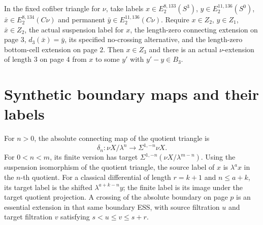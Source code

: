 \begin{theorem}
\label{sem:ProofTools:nu-zero-layer}
In the fixed cofiber triangle for $\nu$, take labels $x\in E_2^{8,133}(S^3)$, $y\in E_2^{11,136}(S^0)$, $\bar x\in E_2^{8,134}(C\nu)$ and permanent $\bar y\in E_2^{11,136}(C\nu)$. Require $x\in Z_2$, $y\in Z_1$, $\bar x\in Z_2$, the actual suspension label for $x$, the length-zero connecting extension on page $3$, $d_3(\bar x)=\bar y$, its specified no-crossing alternative, and the length-zero bottom-cell extension on page $2$. Then $x\in Z_3$ and there is an actual $\nu$-extension of length $3$ on page $4$ from $x$ to some $y'$ with $y'-y\in B_3$.
\end{theorem}

\section{Synthetic boundary maps and their labels}
\begin{definition}
\label{sem:ProofTools:synthetic-boundary-labels}
For $n>0$, the absolute connecting map of the quotient triangle is
\[\delta_n:\nu X/\lambda^n\longrightarrow\Sigma^{1,-n}\nu X.\]
For $0<n<m$, its finite version has target $\Sigma^{1,-n}(\nu X/\lambda^{m-n})$. Using the suspension isomorphism of the quotient triangle, the source label of $x$ is $\lambda^a x$ in the $n$-th quotient. For a classical differential of length $r=k+1$ and $n\leq a+k$, its target label is the shifted $\lambda^{a+k-n}y$; the finite label is its image under the target quotient projection. A crossing of the absolute boundary on page $p$ is an essential extension in that same boundary ESS, with source filtration $u$ and target filtration $v$ satisfying $s<u\leq v\leq s+r$.
\end{definition}

